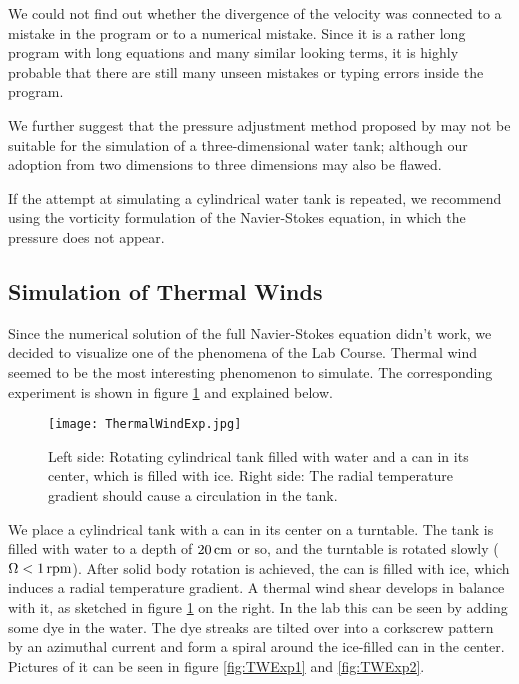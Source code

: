\documentclass[12pt, a4paper]{article} %
\begin{document}
			We could not find out whether the divergence of the velocity was connected to a mistake in the program or to a numerical mistake. Since it is a rather long program with long equations and many similar looking terms, it is highly probable that there are still many unseen mistakes or typing errors inside the program.
			
			We further suggest that the pressure adjustment method proposed by \cite{Schmittfull2005} may not be suitable for the simulation of a three-dimensional water tank; although our adoption from two dimensions to three dimensions may also be flawed.
			
			If the attempt at simulating a cylindrical water tank is repeated, we recommend using the vorticity formulation of the Navier-Stokes equation, in which the pressure does not appear.
			
			\newpage
			
	\subsection{Simulation of Thermal Winds}
		Since the numerical solution of the full Navier-Stokes equation didn't work, we decided to visualize one of the phenomena of the Lab Course. Thermal wind seemed to be the most interesting phenomenon to simulate. The corresponding experiment is shown in figure \ref{fig:TWExperiment} and explained below.
		
		\begin{figure}[h]
			\centering
			\texttt{[image: ThermalWindExp.jpg]}
			\caption{Left side: Rotating cylindrical tank filled with water and a can in its center, which is filled with ice. Right side: The radial temperature gradient should cause a circulation in the tank. \cite{Marshall1965}}
			\label{fig:TWExperiment}
		\end{figure}
		
		We place a cylindrical tank with a can in its center on a turntable. The tank is filled with water to a depth of $\unit[20]{cm}$ or so, and the turntable is rotated slowly ($\Omega < \unit[1]{rpm}$). After solid body rotation is achieved, the can is filled with ice, which induces a radial temperature gradient. A thermal wind shear develops in balance with it, as sketched in figure \ref{fig:TWExperiment} on the right.
		\newline
		In the lab this can be seen by adding some dye in the water. The dye streaks are tilted over into a corkscrew pattern by an azimuthal current and form a spiral around the ice-filled can in the center. Pictures of it can be seen in figure \ref{fig:TWExp1} and \ref{fig:TWExp2}.
		
\end{document}
